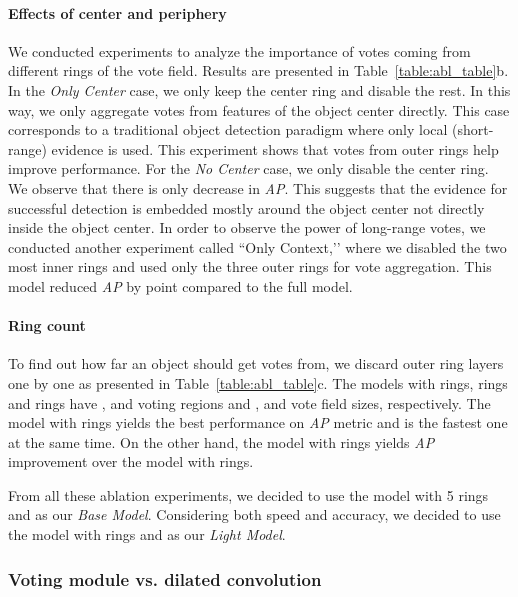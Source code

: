 \documentclass[runningheads]{llncs}
\begin{document}
                          
\paragraph{\textbf{Effects of center and periphery}} We conducted experiments to analyze the importance of votes coming from different rings of the vote field. Results are presented in Table~\ref{table:abl_table}b. In the \textit{Only Center} case, we only keep the center ring and disable the rest. In this way, we only aggregate votes from features of the object center directly. This case corresponds to a traditional object detection paradigm where only local (short-range) evidence is used.  This experiment shows that votes from outer rings help  improve performance. For the \textit{No Center} case,  we only disable the  center ring. We observe that there is only  decrease in \textit{AP}. This suggests that the evidence  for successful detection is embedded mostly around the object center not directly inside the object center. In order to observe the power of long-range votes, we conducted another experiment called ``Only Context,’’ where we disabled the two most inner rings and used  only the three outer rings for vote aggregation. This model  reduced \textit{AP} by  point compared to the full model. 




        
\paragraph{\textbf{Ring count}} To find out how far an object should get votes from, we discard outer ring layers one by one as presented in Table~\ref{table:abl_table}c. The models with  rings,  rings and  rings have ,  and  voting regions and ,  and  vote field sizes, respectively. The model with  rings yields the best performance on \textit{AP} metric and is the fastest one at the same time. On the other hand, the model with  rings yields  \textit{AP} improvement over the model with  rings. 


From all these ablation experiments, we decided to use the model with 5 rings and  as our \textit{Base Model}. Considering both speed and accuracy, we decided to use the model with  rings and  as our \textit{Light Model}. 










\subsubsection{Voting module vs. dilated convolution}
\label{sec:comp_abl}
\end{document}
